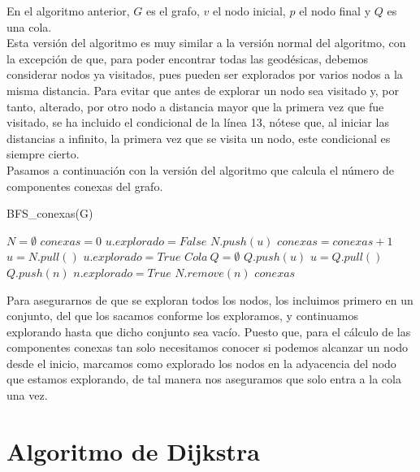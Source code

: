 En el algoritmo anterior, $G$ es el grafo, $v$ el nodo inicial, $p$ el nodo final y $Q$ es una cola. \\

Esta versión del algoritmo es muy similar a la versión normal del algoritmo, con la excepción de que, para poder encontrar todas las geodésicas, debemos considerar nodos ya visitados, pues pueden ser explorados por varios nodos a la misma distancia. Para evitar que antes de explorar un nodo sea visitado y, por tanto, alterado, por otro nodo a distancia mayor que la primera vez que fue visitado, se ha incluido el condicional de la línea 13, nótese que, al iniciar las distancias a infinito, la primera vez que se visita un nodo, este condicional es siempre cierto. \\

Pasamos a continuación con la versión del algoritmo que calcula el número de componentes conexas del grafo.

\begin{breakablealgorithm}
	\caption{BFS\_conexas(G)}
	\begin{algorithmic}[1]
		\State $N = \emptyset$
		\State $conexas = 0$
			\State $u.explorado = False$
			\State $N.push(u)$
		\EndFor
			\State $conexas = conexas + 1$
			\State $u = N.pull()$
			\State $u.explorado = True$
			\State $Cola\ Q = \emptyset$
			\State $Q.push(u)$		
				\State $u = Q.pull()$
						\State $Q.push(n)$
						\State $n.explorado = True$
						\State $N.remove(n)$
					\EndIf
				\EndFor
			\EndWhile
		\EndWhile
		\Return $conexas$
	\end{algorithmic}
\end{breakablealgorithm}

Para asegurarnos de que se exploran todos los nodos, los incluimos primero en un conjunto, del que los sacamos conforme los exploramos, y continuamos explorando hasta que dicho conjunto sea vacío. Puesto que, para el cálculo de las componentes conexas tan solo necesitamos conocer si podemos alcanzar un nodo desde el inicio, marcamos como explorado los nodos en la adyacencia del nodo que estamos explorando, de tal manera nos aseguramos que solo entra a la cola una vez. 

\section{Algoritmo de Dijkstra}

